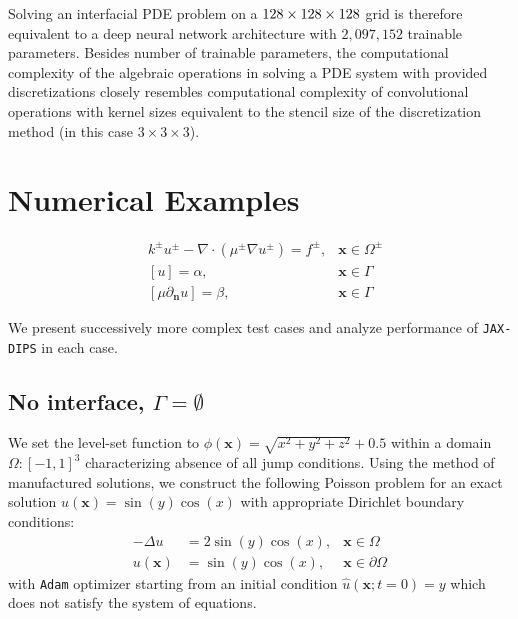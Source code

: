 \documentclass{elsarticle}
\begin{document}
Solving an interfacial PDE problem on a $\rm 128\times 128 \times 128$ grid is therefore equivalent to a deep neural network architecture with $2,097,152$ trainable parameters. Besides number of trainable parameters, the computational complexity of the algebraic operations in solving a PDE system with provided discretizations closely resembles computational complexity of convolutional operations with kernel sizes equivalent to the stencil size of the discretization method (in this case $3\times 3 \times 3$).

\section{Numerical Examples}

\begin{align*}
	 & k^{\pm}u^{\pm} - \nabla \cdot (\mu^{\pm}\nabla u^\pm)=f^{\pm}, & \mathbf{x}\in\Omega^\pm \\
	 & [u]=\alpha,                                                    & \mathbf{x} \in \Gamma   \\
	 & [\mu \partial_{\mathbf{n}}u]=\beta,                            & \mathbf{x} \in \Gamma
\end{align*}



We present successively more complex test cases and analyze performance of \texttt{JAX-DIPS} in each case.


\subsection{No interface, $\Gamma=\emptyset $}
We set the level-set function to $\phi(\mathbf{x})=\sqrt{x^2 + y^2 + z^2} + 0.5$ within a domain $\Omega:[-1,1]^3$ characterizing absence of all jump conditions. Using the method of manufactured solutions, we construct the following Poisson problem for an exact solution $u(\mathbf{x}) = \sin(y)\cos(x)$ with appropriate Dirichlet boundary conditions:
\begin{align*}
	 - \Delta u &=2\sin(y)\cos(x), & \mathbf{x}\in\Omega\\
	 u(\mathbf{x}) &= \sin(y)\cos(x), &\mathbf{x}\in \partial \Omega
\end{align*}
with \texttt{Adam} optimizer starting from an initial condition $\hat{u}(\mathbf{x};t=0)=y$ which does not satisfy the system of equations.
\end{document}
